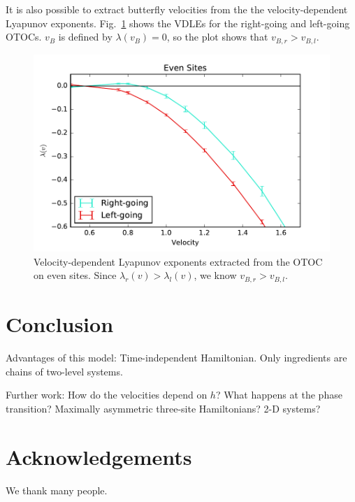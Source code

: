 \documentclass[aps,prl,reprint,superscriptaddress, longbibliography]{revtex4-1}
\begin{document}
It is also possible to extract butterfly velocities from the the velocity-dependent Lyapunov exponents. Fig.~\ref{fig:vdle} shows the VDLEs for the right-going and left-going OTOCs. $v_B$ is defined by $\lambda(v_B) = 0$, so the plot shows that $v_{B,r}>v_{B,l}$.

\begin{figure}
	\includegraphics[width=\columnwidth]{vdle}
	\caption{Velocity-dependent Lyapunov exponents extracted from the OTOC on even sites. Since $\lambda_r(v)>\lambda_l(v)$, we know $v_{B,r}>v_{B,l}$.}
	\label{fig:vdle}
\end{figure}

\section{Conclusion}

Advantages of this model:
Time-independent Hamiltonian.
Only ingredients are chains of two-level systems.

Further work:
How do the velocities depend on $h$?
What happens at the phase transition?
Maximally asymmetric three-site Hamiltonians?
2-D systems?


\section*{Acknowledgements}
We thank many people.



\begin{appendix}


\end{appendix}
\end{document}
